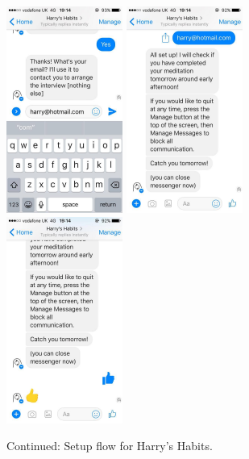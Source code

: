 \begin{figure}[H]
  \centering
  \includegraphics[width=1.5in]{resources/design/process/13.jpg}
  \hspace{10px}
  \includegraphics[width=1.5in]{resources/design/process/14.jpg}
  \hspace{10px}
  \includegraphics[width=1.5in]{resources/design/process/15.jpg}
  \caption{Continued: Setup flow for Harry's Habits.}
  \label{fig:setup_flow_screenshots_2}
\end{figure}



